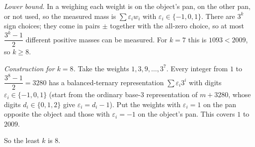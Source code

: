 \emph{Lower bound.} In a weighing each weight is on the object's pan, on the other pan, or not used, so the measured mass is $\sum\varepsilon_iw_i$ with $\varepsilon_i\in\{-1,0,1\}$. There are $3^k$ sign choices; they come in pairs $\pm$ together with the all-zero choice, so at most $\dfrac{3^k-1}{2}$ different positive masses can be measured. For $k=7$ this is $1093<2009$, so $k\ge8$.

\emph{Construction for $k=8$.} Take the weights $1,3,9,\dots,3^7$. Every integer from $1$ to $\dfrac{3^8-1}{2}=3280$ has a balanced-ternary representation $\sum\varepsilon_i3^i$ with digits $\varepsilon_i\in\{-1,0,1\}$ (start from the ordinary base-$3$ representation of $m+3280$, whose digits $d_i\in\{0,1,2\}$ give $\varepsilon_i=d_i-1$). Put the weights with $\varepsilon_i=1$ on the pan opposite the object and those with $\varepsilon_i=-1$ on the object's pan. This covers $1$ to $2009$.

So the least $k$ is $\boxed{8}$.
